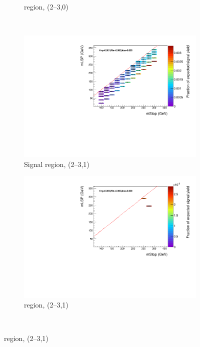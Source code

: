 \begin{figure}[ht!]
\begin{subfigure}[b]{0.47\textwidth}
    \caption{\mj region, (2--3,0)}
    \label{fig:t2cc_mu_eff_le3j_0b}
  \end{subfigure} \\
  \begin{subfigure}[b]{0.47\textwidth}
    \includegraphics[width=\textwidth]{Figs/sms/t2cc/v37/effs/T2cc_had_eff_maps_eq1b_le3j_SITV.pdf}
    \caption{Signal region, (2--3,1)}
    \label{fig:t2cc_sig_eff_le3j_1b}
  \end{subfigure}
  \begin{subfigure}[b]{0.47\textwidth}
    \includegraphics[width=\textwidth]{Figs/sms/t2cc/v37/effs/T2cc_muon_eff_maps_eq1b_le3j_SITV.pdf}
    \caption{\mj region, (2--3,1)}
    \label{fig:t2cc_mu_eff_le3j_1b}
  \end{subfigure} \\

\end{figure}
